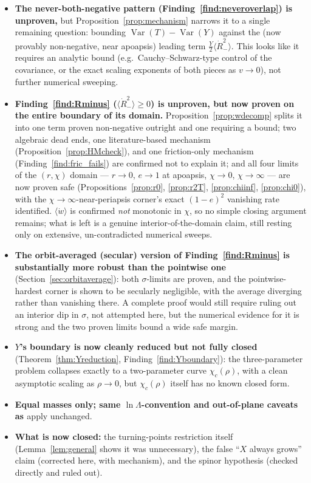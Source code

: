 \documentclass[12pt]{amsart}
\theoremstyle{plain}
\theoremstyle{remark}
\begin{document}
\begin{itemize}
\item[--] \textbf{The never-both-negative pattern (Finding~\ref{find:neveroverlap}) is unproven,} but Proposition~\ref{prop:mechanism} narrows it to a single remaining question: bounding $\operatorname{Var}(T)-\operatorname{Var}(Y)$ against the (now provably non-negative, near apoapsis) leading term $\tfrac{Y}{2}\langle\dot R_-^2\rangle$. This looks like it requires an analytic bound (e.g.\ Cauchy--Schwarz-type control of the covariance, or the exact scaling exponents of both pieces as $v\to0$), not further numerical sweeping.
\item[--] \textbf{Finding~\ref{find:Rminus} ($\langle\dot R_-^2\rangle\geq0$) is unproven, but now proven on the entire boundary of its domain.} Proposition~\ref{prop:wdecomp} splits it into one term proven non-negative outright and one requiring a bound; two algebraic dead ends, one literature-based mechanism (Proposition~\ref{prop:HMcheck}), and one friction-only mechanism (Finding~\ref{find:fric_fails}) are confirmed not to explain it; and all four limits of the $(r,\chi)$ domain --- $r\to0$, $e\to1$ at apoapsis, $\chi\to0$, $\chi\to\infty$ --- are now proven safe (Propositions~\ref{prop:r0}, \ref{prop:r2T}, \ref{prop:chiinf}, \ref{prop:chi0}), with the $\chi\to\infty$-near-periapsis corner's exact $(1-e)^2$ vanishing rate identified. $\langle\dot w\rangle$ is confirmed \emph{not} monotonic in $\chi$, so no simple closing argument remains; what is left is a genuine interior-of-the-domain claim, still resting only on extensive, un-contradicted numerical sweeps.
\item[--] \textbf{The orbit-averaged (secular) version of Finding~\ref{find:Rminus} is substantially more robust than the pointwise one} (Section~\ref{sec:orbitaverage}): both $\sigma$-limits are proven, and the pointwise-hardest corner is shown to be secularly negligible, with the average diverging rather than vanishing there. A complete proof would still require ruling out an interior dip in $\sigma$, not attempted here, but the numerical evidence for it is strong and the two proven limits bound a wide safe margin.
\item[--] \textbf{$Y$'s boundary is now cleanly reduced but not fully closed} (Theorem~\ref{thm:Yreduction}, Finding~\ref{find:Yboundary}): the three-parameter problem collapses exactly to a two-parameter curve $\chi_c(\rho)$, with a clean asymptotic scaling as $\rho\to0$, but $\chi_c(\rho)$ itself has no known closed form.
\item[--] \textbf{Equal masses only; same $\ln\Lambda$-convention and out-of-plane caveats as \cite{Ebert2026Rosenbluth,Ebert2026Cancellation}} apply unchanged.
\item[--] \textbf{What is now closed:} the turning-points restriction itself (Lemma~\ref{lem:general} shows it was unnecessary), the false ``$X$ always grows'' claim (corrected here, with mechanism), and the spinor hypothesis (checked directly and ruled out).
\end{itemize}
\end{document}
